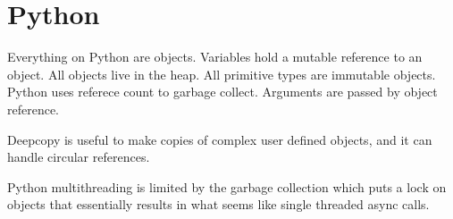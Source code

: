 \section{Python}
Everything on Python are objects. Variables hold a mutable reference to
an object. All objects live in the heap. All primitive types are
immutable objects. Python uses referece count to garbage collect.
Arguments are passed by object reference.

Deepcopy is useful to make copies of complex user defined objects, and it
can handle circular references.

Python multithreading is limited by the garbage collection which puts a
lock on objects that essentially results in what seems like single
threaded async calls.
